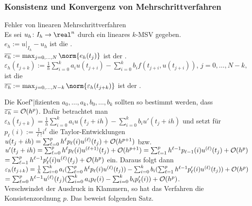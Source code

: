 \subsubsection{%
    Konsistenz und Konvergenz von Mehrschrittverfahren%
}

\begin{Def}{Fehler von linearen Mehrschrittverfahren}\\
    Es sei $u_h\colon I_h \rightarrow \real^n$ durch ein lineares
    $k$-MSV gegeben.\\
    $e_h := u|_{I_h} - u_h$ ist die .\\
    $\overline{e_h} := \max_{j=0,\dotsc,N} \norm{e_h(t_j)}$ ist der
    .\\
    $\varepsilon_h(t_{j+k}) := \frac{1}{h} \sum_{i=0}^k a_i u(t_{j+i}) -
    \sum_{i=0}^k b_i f(t_{j+i}, u(t_{j+i}))$, $j = 0, \dotsc, N - k,$
    ist die \\
    $\overline{\varepsilon_h} :=
    \max_{j=0,\dotsc,N-k} \norm{\varepsilon_h(t_{j+k})}$ ist der
    .
\end{Def}

\begin{Bem}
    Die Koef"|fizienten $a_0, \dotsc, a_k, b_0, \dotsc, b_k$ sollten so
    bestimmt werden, dass\\
    $\overline{\varepsilon_h} = \mathcal{O}(h^p)$.
    Dafür betrachtet man $\varepsilon_h(t_{j+k}) =
    \frac{1}{h} \sum_{i=0}^k a_i u(t_j + ih) - \sum_{i=0}^k b_i u'(t_j + ih)$
    und setzt für $p_\ell(i) := \frac{1}{\ell!} i^\ell$
    die Taylor-Entwicklungen
    $u(t_j + ih) = \sum_{\ell=0}^p h^\ell p_\ell(i) u^{(\ell)}(t_j) +
    \mathcal{O}(h^{p+1})$ bzw.\\
    $u'(t_j + ih) = \sum_{\ell=0}^p h^\ell p_\ell(i) u^{(\ell+1)}(t_j) +
    \mathcal{O}(h^{p+1}) =
    \sum_{\ell=1}^p h^{\ell-1} p_{\ell-1}(i) u^{(\ell)}(t_j) + \mathcal{O}(h^p)$\\
    $= \sum_{\ell=1}^p h^{\ell-1} p_\ell'(i) u^{(\ell)}(t_j) + \mathcal{O}(h^p)$
    ein.
    Daraus folgt dann\\
    $\varepsilon_h(t_{j+k}) =
    \frac{1}{h} \sum_{i=0}^k a_i
    (\sum_{\ell=0}^p h^\ell p_\ell(i) u^{(\ell)}(t_j)) -
    \sum_{i=0}^k b_i
    (\sum_{\ell=1}^p h^{\ell-1} p_\ell'(i) u^{(\ell)}(t_j)) + \mathcal{O}(h^p)$\\
    $= \sum_{\ell=0}^p h^{\ell-1} u^{(\ell)}(t_j)
    (\sum_{i=0}^k a_i p_\ell(i) - \sum_{i=0}^k b_i p_\ell'(i)) + \mathcal{O}(h^p)$.\\
    Verschwindet der Ausdruck in Klammern, so hat das Verfahren die
    Konsistenzordnung $p$.
    Das beweist folgenden Satz.
\end{Bem}

